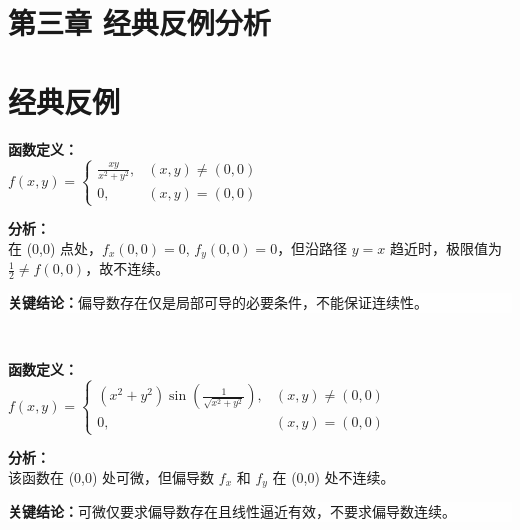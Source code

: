 \documentclass[12pt,a4paper]{article}
\begin{document}
\section{第三章  经典反例分析}

\section*{经典反例}

\begin{tcolorbox}[title={\textbf{【反例】偏导存在 ≠ 连续}},
    colback=white,
    coltitle=#3498DB,
    colframe=#3498DB,
    fonttitle={\bfseries},
    sharp corners=rounded,
    rounded corners={at={(0,0)}},
    width={\textwidth}]

\textbf{函数定义：}\\
$f(x,y) = \begin{cases} \frac{xy}{x^2+y^2}, & (x,y) \neq (0,0) \\ 0, & (x,y) = (0,0) \end{cases}$

\vspace{0.3cm}
\textbf{分析：}\\
在 (0,0) 点处，$f_x(0,0)=0$, $f_y(0,0)=0$，但沿路径 $y=x$ 趋近时，极限值为 $\frac{1}{2} \neq f(0,0)$，故不连续。

\vspace{0.3cm}
\colorbox{rgba(255,255,255,0.7)}{\parbox{0.95\textwidth}{
\textbf{关键结论：}偏导数存在仅是局部可导的必要条件，不能保证连续性。
}}
\end{tcolorbox}\\
\vspace{0.5cm}

\begin{tcolorbox}[title={\textbf{【反例】可微 ≠ 偏导连续}},
    colback=white,
    coltitle=#3498DB,
    colframe=#3498DB,
    fonttitle={\bfseries},
    sharp corners=rounded,
    rounded corners={at={(0,0)}},
    width={\textwidth}]

\textbf{函数定义：}\\
$f(x,y) = \begin{cases} (x^2+y^2)\sin\left(\frac{1}{\sqrt{x^2+y^2}}\right), & (x,y) \neq (0,0) \\ 0, & (x,y) = (0,0) \end{cases}$

\vspace{0.3cm}
\textbf{分析：}\\
该函数在 (0,0) 处可微，但偏导数 $f_x$ 和 $f_y$ 在 (0,0) 处不连续。

\vspace{0.3cm}
\colorbox{rgba(255,255,255,0.7)}{\parbox{0.95\textwidth}{
\textbf{关键结论：}可微仅要求偏导数存在且线性逼近有效，不要求偏导数连续。
}}
\end{tcolorbox}\\
\vspace{0.5cm}
\end{document}
